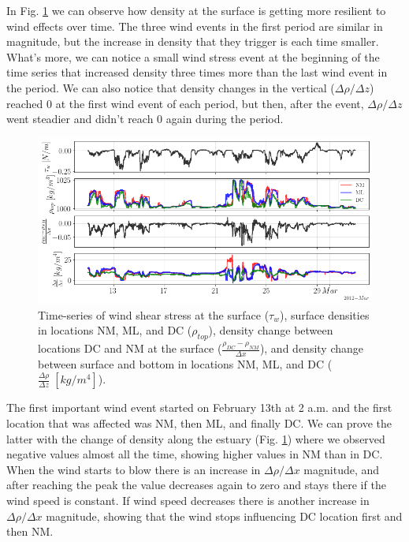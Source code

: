 \documentclass[tesis.tex]{subfiles}
\begin{document}
In Fig. \ref{fig:diff} we can observe how density at the surface is getting more resilient to wind effects over time. The three wind events in the first period are similar in magnitude, but the increase in density that they trigger is each time smaller. What's more, we can notice a small wind stress event at the beginning of the time series that increased density three times more than the last wind event in the period. We can also notice that density changes in the vertical ($\Delta \rho/\Delta z$) reached 0 at the first wind event of each period, but then, after the event, $\Delta \rho/\Delta z$ went steadier and didn't reach 0 again during the period.\\

\begin{figure}[h!]
    \centering
    \includegraphics[width=\textwidth]{Imagenes/diff.png}
    \caption{Time-series of wind shear stress at the surface ($\tau_w$), surface densities in locations NM, ML, and DC ($\rho_{top}$), density change between locations DC and NM at the surface ($\frac{\rho_{DC}-\rho_{NM}}{\Delta x}$), and density change between surface and bottom in locations NM, ML, and DC ($\frac{\Delta \rho}{\Delta z} \; [kg/m^4]$).}
    \label{fig:diff}
\end{figure}

The first important wind event started on February 13th at 2 a.m. and the first location that was affected was NM, then ML, and finally DC. We can prove the latter with the change of density along the estuary (Fig. \ref{fig:diff}) where we observed negative values almost all the time, showing higher values in NM than in DC. When the wind starts to blow there is an increase in $\Delta \rho/\Delta x$ magnitude, and after reaching the peak the value decreases again to zero and stays there if the wind speed is constant. If wind speed decreases there is another increase in $\Delta \rho/\Delta x$ magnitude, showing that the wind stops influencing DC location first and then NM.\\
\end{document}
